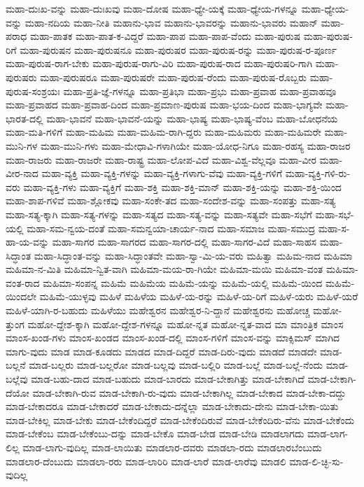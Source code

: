 {ಮಹಾ-ದುಃಖ-ವನ್ನು
ಮಹಾ-ದುಃಖವು
ಮಹಾ-ದೋಷ
ಮಹಾ-ಧ್ಯೇ-ಯಕ್ಕೆ
ಮಹಾ-ಧ್ಯೇಯ-ಗಳನ್ನೂ
ಮಹಾ-ಧ್ಯೇಯ-ವನ್ನು
ಮಹಾ-ನದಿಯ
ಮಹಾ-ನೀತಿ
ಮಹಾನು-ಭಾವ
ಮಹಾನು-ಭಾವರನ್ನು
ಮಹಾನು-ಭಾವರು
ಮಹಾನ್
ಮಹಾ-ಪರಾಧ
ಮಹಾ-ಪಾತಕ
ಮಹಾ-ಪಾತ-ಕ-ವಿದ್ದರೆ
ಮಹಾ-ಪಾಪ
ಮಹಾ-ಪಾಪ-ವೆಂದು
ಮಹಾ-ಪುರುಷ
ಮಹಾ-ಪುರುಷ-ರಿಗೆ
ಮಹಾ-ಪುರುಷನ
ಮಹಾ-ಪುರುಷನೂ
ಮಹಾ-ಪುರುಷರ
ಮಹಾ-ಪುರುಷ-ರನ್ನು
ಮಹಾ-ಪುರುಷ-ರ-ಪೂರ್ಣ
ಮಹಾ-ಪುರುಷ-ರಾಗ-ಬೇಕು
ಮಹಾ-ಪುರುಷ-ರಾಗು-ವಿರಿ
ಮಹಾ-ಪುರುಷ-ರಾದ
ಮಹಾ-ಪುರುಷರಿ-ಗಾಗಿ
ಮಹಾ-ಪುರುಷರು
ಮಹಾ-ಪುರುಷರೂ
ಮಹಾ-ಪುರುಷರೇ
ಮಹಾ-ಪುರುಷ-ರೆಂದು
ಮಹಾ-ಪುರುಷ-ರೊಬ್ಬರು
ಮಹಾ-ಪುರುಷ-ಸಂಶ್ರಯಃ
ಮಹಾ-ಪ್ರತಿ-ಜ್ಞೆ-ಗಳನ್ನೂ
ಮಹಾ-ಪ್ರತಿಭಾ
ಮಹಾ-ಪ್ರಭು
ಮಹಾ-ಪ್ರವಾಹ
ಮಹಾ-ಪ್ರವಾಹವೂ
ಮಹಾ-ಪ್ರವಾಹದ
ಮಹಾ-ಪ್ರವಾಹ-ದಿಂದ
ಮಹಾ-ಪ್ರಮಾಣ-ಪುರುಷ
ಮಹಾ-ಭಯ-ದಿಂದ
ಮಹಾ-ಭಾಗ್ಯವೇ
ಮಹಾ-ಭಾರತ-ದಲ್ಲಿ
ಮಹಾ-ಭಾವನೆ
ಮಹಾ-ಭಾವನೆ-ಯನ್ನು
ಮಹಾ-ಭಾಷ್ಯ
ಮಹಾ-ಭಾಷ್ಯ-ವೆಂಬ
ಮಹಾ-ಬೋಧನೆಯ
ಮಹಾ-ಮತಿ-ಗಳಿಗೆ
ಮಹಾ-ಮಹಿಮ
ಮಹಾ-ಮಹಿಮ-ರಾಗಿ-ದ್ದರು
ಮಹಾ-ಮಹಿಮರು
ಮಹಾ-ಮಹಿಮರೇ
ಮಹಾ-ಮುನಿ-ಗಳ
ಮಹಾ-ಮುನಿ-ಗಳು
ಮಹಾ-ಮೇಧಾವಿ-ಗಳಾಗಿಯೇ
ಮಹಾ-ಯೋಧ-ನಿಗೂ
ಮಹಾ-ರಹಸ್ಯ
ಮಹಾ-ರಾಜರ
ಮಹಾ-ರಾಜರು
ಮಹಾ-ರಾಜರೇ
ಮಹಾ-ರಾಷ್ಟ್ರ
ಮಹಾ-ಲೋಪ-ವಿದೆ
ಮಹಾ-ವಿಶ್ವ-ವೆಲ್ಲವೂ
ಮಹಾ-ವೀರ
ಮಹಾ-ವೀರ-ನಾದ
ಮಹಾ-ವ್ಯಕ್ತಿ
ಮಹಾ-ವ್ಯಕ್ತಿ-ಗಳನ್ನು
ಮಹಾ-ವ್ಯಕ್ತಿ-ಗಳಾಗು-ವೆವು
ಮಹಾ-ವ್ಯಕ್ತಿ-ಗಳಿಗೆ
ಮಹಾ-ವ್ಯಕ್ತಿ-ಗಳಿ-ರು-ವರು
ಮಹಾ-ವ್ಯಕ್ತಿ-ಗಳು
ಮಹಾ-ವ್ಯಕ್ತಿಗೆ
ಮಹಾ-ಶಕ್ತಿ
ಮಹಾ-ಶಕ್ತಿ-ಮಾನ್
ಮಹಾ-ಶಕ್ತಿ-ಯನ್ನು
ಮಹಾ-ಶಕ್ತಿ-ಯಿಂದ
ಮಹಾ-ಶಾಪ-ಗಳಿವೆ
ಮಹಾ-ಶ್ಲೋಕವು
ಮಹಾ-ಸಂಕೇ-ತದ
ಮಹಾ-ಸಂದೇಶ-ವನ್ನು
ಮಹಾ-ಸಂಪತ್ತು
ಮಹಾ-ಸತ್ಯ
ಮಹಾ-ಸತ್ಯ-ಕ್ಕಾಗಿ
ಮಹಾ-ಸತ್ಯ-ಗಳನ್ನು
ಮಹಾ-ಸತ್ಯದ
ಮಹಾ-ಸತ್ಯ-ವನ್ನು
ಮಹಾ-ಸತ್ಯವೇ
ಮಹಾ-ಸಭೆಗೆ
ಮಹಾ-ಸಭೆ-ಯಲ್ಲಿ
ಮಹಾ-ಸಮ-ನ್ವಯ-ದಂತೆ
ಮಹಾ-ಸಮನ್ವಯಾ-ಚಾರ್ಯ-ನಾದ
ಮಹಾ-ಸಮಾಜ
ಮಹಾ-ಸಮುದ್ರ
ಮಹಾ-ಸ-ಹಾ-ಯ-ವನ್ನು
ಮಹಾ-ಸಾಗರ
ಮಹಾ-ಸಾಗರದ
ಮಹಾ-ಸಾಗರ-ದಲ್ಲಿ
ಮಹಾ-ಸಾಗರ-ವಿದೆ
ಮಹಾ-ಸಾಹಸ
ಮಹಾ-ಸಿದ್ಧಾಂತ
ಮಹಾ-ಸಿದ್ಧಾಂತ-ವನ್ನು
ಮಹಾ-ಸಿದ್ಧಾಂತವೇ
ಮಹಾ-ಸ್ವಾ-ಮಿ-ಯ-ವರು
ಮಹಿತ್ವಾ
ಮಹಿಮ-ನಾದ
ಮಹಿಮಾ
ಮಹಿಮಾ-ನ-ಮಿತಿ
ಮಹಿಮಾ-ನ್ವಿತ-ವಾಗಿ
ಮಹಿಮಾ-ಮಯ-ರಾ-ಗಿಯೇ
ಮಹಿಮಾ-ಮಯಿ
ಮಹಿಮಾ-ವಂತ
ಮಹಿಮಾ-ವಂತ-ರಾದ
ಮಹಿಮಾ-ಸಂಪನ್ನ
ಮಹಿಮೆ
ಮಹಿಮೆಯ
ಮಹಿಮೆ-ಯನ್ನು
ಮಹಿಮೆ-ಯಲ್ಲಿ
ಮಹಿಮೆ-ಯಿಂದ
ಮಹಿಮೆ-ಯಿಂದಲೇ
ಮಹಿಮೆ-ಯುಳ್ಳವು
ಮಹಿಳೆ
ಮಹಿಳೆಯ
ಮಹಿಳೆ-ಯ-ರನ್ನು
ಮಹಿಳೆ-ಯ-ರಿಗೆ
ಮಹಿಳೆ-ಯರು
ಮಹಿಳೆ-ಯರೆ
ಮಹಿಳೆ-ಯಾಗಿ-ರ-ಬಹುದು
ಮಹಿಳೆಯು
ಮಹೇಶ್ವರನ
ಮಹೇಶ್ವರ-ನಿ-ದ್ದಾನೆ
ಮಹೇಶ್ವರನು
ಮಹೋಚ್ಚ
ಮಹೋ-ತ್ತುಂಗ
ಮಹೋ-ದ್ದೇಶ-ಕ್ಕಾಗಿ
ಮಹೋ-ದ್ದೇಶ-ಗಳನ್ನೂ
ಮಹೋ-ನ್ನತ
ಮಹೋ-ನ್ನತ-ವಾದ
ಮಾ
ಮಾಂತ್ರಿಕ
ಮಾಂಸ
ಮಾಂಸ-ಖಂಡ-ಗಳು
ಮಾಂಸ-ಖಂಡದ
ಮಾಂಸ-ಖಂಡ-ದಲ್ಲಿ
ಮಾಂಸ-ಗಳಿಗೆ
ಮಾಂಸ-ವನ್ನು
ಮಾಕ್ಸಿಮಸ್
ಮಾಗಿದ
ಮಾಗು-ವುದು
ಮಾಡ
ಮಾಡ-ಕೂಡದು
ಮಾಡದ
ಮಾಡ-ದಿದ್ದರೆ
ಮಾಡ-ದಿರು-ವುದು
ಮಾಡದೆ
ಮಾಡದೇ
ಮಾಡ-ಬಲ್ಲನೆ
ಮಾಡ-ಬಲ್ಲರು
ಮಾಡ-ಬಲ್ಲರೋ
ಮಾಡ-ಬಲ್ಲವು
ಮಾಡ-ಬಲ್ಲಿರಿ
ಮಾಡ-ಬಲ್ಲೆ
ಮಾಡ-ಬಲ್ಲೆ-ನೆಂದು
ಮಾಡ-ಬಲ್ಲೆವು
ಮಾಡ-ಬಹು-ದಾದ
ಮಾಡ-ಬಹುದು
ಮಾಡ-ಬಾರದು
ಮಾಡ-ಬೇಕಾಗಿತ್ತು
ಮಾಡ-ಬೇಕಾಗಿದೆ
ಮಾಡ-ಬೇಕಾಗಿ-ದೆಯೋ
ಮಾಡ-ಬೇಕಾಗಿ-ರುವ
ಮಾಡ-ಬೇಕಾಗಿ-ರು-ವುದು
ಮಾಡ-ಬೇಕಾಗಿಲ್ಲ
ಮಾಡ-ಬೇಕಾದ
ಮಾಡ-ಬೇಕಾ-ದದ್ದು
ಮಾಡ-ಬೇಕಾದರೂ
ಮಾಡ-ಬೇಕಾದರೆ
ಮಾಡ-ಬೇಕಾದು-ದನ್ನೆಲ್ಲಾ
ಮಾಡ-ಬೇಕಾದು-ದೇನು
ಮಾಡ-ಬೇಕಾ-ಯಿತು
ಮಾಡ-ಬೇಕಿಲ್ಲ
ಮಾಡ-ಬೇಕು
ಮಾಡ-ಬೇಕೆಂದಿದ್ದರೆ
ಮಾಡ-ಬೇಕೆಂದಿರುವೆ
ಮಾಡ-ಬೇಕೆಂದಿರು-ವೆನು
ಮಾಡ-ಬೇಕೆಂದು
ಮಾಡ-ಬೇಕೆಂಬ
ಮಾಡ-ಬೇಕೆಂಬು-ದನ್ನು
ಮಾಡ-ಬೇಕೊ
ಮಾಡ-ಬೇಡ
ಮಾಡ-ಬೇಡಿ
ಮಾಡಲಾಗದು
ಮಾಡ-ಲಾಗ-ಲಿಲ್ಲ
ಮಾಡ-ಲಾಗು-ವುದಿಲ್ಲ
ಮಾಡ-ಲಾಯಿತು
ಮಾಡಲಾರ-ದವರು
ಮಾಡಲಾ-ರದು
ಮಾಡಲಾರಬೆಂಬುದು
ಮಾಡಲಾರ-ದೆಂಬುದು
ಮಾಡಲಾ-ರರು
ಮಾಡ-ಲಾರಿರಿ
ಮಾಡ-ಲಾರೆ
ಮಾಡ-ಲಾರೆವು
ಮಾಡಲಿ
ಮಾಡ-ಲಿ-ಚ್ಛಿ-ಸು-ವುದಿಲ್ಲ
}

